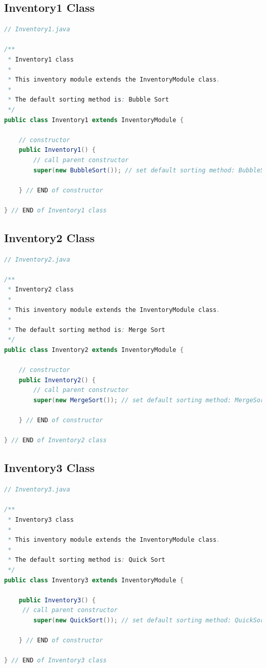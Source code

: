 \documentclass[12pt]{article}
\begin{document}
\subsection*{Inventory1 Class}
\begin{lstlisting}[language=Java]
// Inventory1.java

/**
 * Inventory1 class
 * 
 * This inventory module extends the InventoryModule class.
 * 
 * The default sorting method is: Bubble Sort
 */
public class Inventory1 extends InventoryModule {

    // constructor
    public Inventory1() {
        // call parent constructor
        super(new BubbleSort()); // set default sorting method: BubbleSort
        
    } // END of constructor

} // END of Inventory1 class
\end{lstlisting}

\subsection*{Inventory2 Class}
\begin{lstlisting}[language=Java]
// Inventory2.java

/**
 * Inventory2 class
 * 
 * This inventory module extends the InventoryModule class.
 * 
 * The default sorting method is: Merge Sort
 */
public class Inventory2 extends InventoryModule {

    // constructor
    public Inventory2() {
        // call parent constructor
        super(new MergeSort()); // set default sorting method: MergeSort
    
    } // END of constructor

} // END of Inventory2 class
\end{lstlisting}

\subsection*{Inventory3 Class}
\begin{lstlisting}[language=Java]
// Inventory3.java

/**
 * Inventory3 class
 * 
 * This inventory module extends the InventoryModule class.
 * 
 * The default sorting method is: Quick Sort
 */
public class Inventory3 extends InventoryModule {

    public Inventory3() {
     // call parent constructor
        super(new QuickSort()); // set default sorting method: QuickSort
    
    } // END of constructor

} // END of Inventory3 class
\end{lstlisting}
\end{document}
